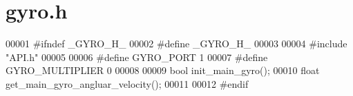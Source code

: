 \section{gyro.\+h}
\label{gyro_8h_source}

\begin{DoxyCode}
00001 \textcolor{preprocessor}{#ifndef \_GYRO\_H\_}
00002 \textcolor{preprocessor}{#define \_GYRO\_H\_}
00003 
00004 \textcolor{preprocessor}{#include "API.h"}
00005 
00006 \textcolor{preprocessor}{#define GYRO\_PORT 1}
00007 \textcolor{preprocessor}{#define GYRO\_MULTIPLIER 0}
00008 
00009 \textcolor{keywordtype}{bool} init_main_gyro();
00010 \textcolor{keywordtype}{float} get_main_gyro_angluar_velocity();
00011 
00012 \textcolor{preprocessor}{#endif}
\end{DoxyCode}
